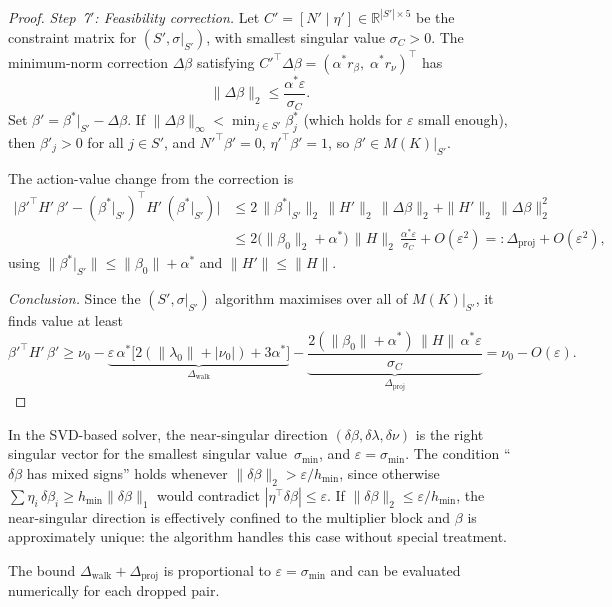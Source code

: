 \begin{proof}
\emph{Step~7${}'$: Feasibility correction.}
Let $C' = [N' \mid \eta'] \in \mathbb{R}^{|S'|\times 5}$
be the constraint matrix for $(S', \sigma|_{S'})$,
with smallest singular value $\sigma_C > 0$.
The minimum-norm correction
$\Delta\beta$ satisfying
${C'}^\top\Delta\beta
  = (\alpha^*r_\beta,\;\alpha^*r_\nu)^\top$
has
\[
  \|\Delta\beta\|_2
  \leq \frac{\alpha^*\varepsilon}{\sigma_C}.
\]
Set $\beta' = \beta^*|_{S'} - \Delta\beta$.
If $\|\Delta\beta\|_\infty < \min_{j \in S'}\beta^*_j$
(which holds for $\varepsilon$ small enough),
then $\beta'_j > 0$ for all $j \in S'$,
and ${N'}^\top\beta' = 0$, ${\eta'}^\top\beta' = 1$,
so $\beta' \in M(K)|_{S'}$.

The action-value change from the correction is
\begin{align*}
  \bigl|{\beta'}^\top H'\,\beta'
    - (\beta^*|_{S'})^\top H'\,(\beta^*|_{S'})\bigr|
  &\leq 2\,\|\beta^*|_{S'}\|_2\,\|H'\|_2\,\|\Delta\beta\|_2
       + \|H'\|_2\,\|\Delta\beta\|_2^2 \\
  &\leq 2\bigl(\|\beta_0\|_2 + \alpha^*\bigr)
        \,\|H\|_2\,
        \frac{\alpha^*\varepsilon}{\sigma_C}
       + O(\varepsilon^2)
  =: \Delta_{\mathrm{proj}} + O(\varepsilon^2),
\end{align*}
using $\|\beta^*|_{S'}\| \leq \|\beta_0\| + \alpha^*$
and $\|H'\| \leq \|H\|$.

\emph{Conclusion.}
Since the $(S', \sigma|_{S'})$ algorithm maximises over
all of $M(K)|_{S'}$, it finds value at least
\[
  {\beta'}^\top H'\,\beta'
  \geq \nu_0
    - \underbrace{
        \varepsilon\,\alpha^*
        \bigl[2(\|\lambda_0\| + |\nu_0|) + 3\alpha^*\bigr]
      }_{\Delta_{\mathrm{walk}}}
    - \underbrace{
        \frac{2(\|\beta_0\| + \alpha^*)\,\|H\|\,
              \alpha^*\varepsilon}{\sigma_C}
      }_{\Delta_{\mathrm{proj}}}
  = \nu_0 - O(\varepsilon).
\]
\end{proof}

\begin{remark}%
\label{rem:approximate-dismissal-algorithm}
In the SVD-based solver, the near-singular direction
$(\delta\beta, \delta\lambda, \delta\nu)$ is the right singular
vector for the smallest singular value~$\sigma_{\min}$,
and $\varepsilon = \sigma_{\min}$.
The condition ``$\delta\beta$ has mixed signs'' holds
whenever $\|\delta\beta\|_2 > \varepsilon / h_{\min}$,
since otherwise
$\sum \eta_i\,\delta\beta_i \geq h_{\min}\|\delta\beta\|_1$
would contradict $|\eta^\top\delta\beta| \leq \varepsilon$.
If $\|\delta\beta\|_2 \leq \varepsilon / h_{\min}$,
the near-singular direction is effectively confined to
the multiplier block and $\beta$ is approximately unique:
the algorithm handles this case without special treatment.

The bound $\Delta_{\mathrm{walk}} + \Delta_{\mathrm{proj}}$
is proportional to $\varepsilon = \sigma_{\min}$ and can be
evaluated numerically for each dropped pair.
\end{remark}

